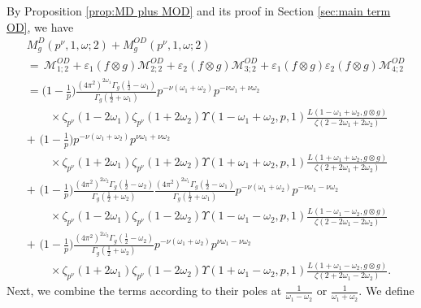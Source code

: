 \documentclass[12pt]{amsart}
\theoremstyle{plain}
\theoremstyle{definition}
\begin{document}
By Proposition \ref{prop:MD plus MOD} and its proof in Section \ref{sec:main term OD}, we have
    \begin{align*}
     &M_g^{D}(p^\nu, 1,\omega;2) +M_g^{OD}(p^\nu, 1, \omega;2)
     \\
    &=\, \mathscr{M}^{OD}_{1;2}
    +   \varepsilon_1(f\otimes g ) \mathscr{M}^{OD}_{2;2}
    +   \varepsilon_2(f\otimes g ) \mathscr{M}^{OD}_{3;2}
    +   \varepsilon_1(f\otimes g )   \varepsilon_2(f\otimes g ) 
    \mathscr{M}^{OD}_{4;2}
    \\
    &=  \Big(1-\frac{1}{p}\Big)
    \frac{(4\pi^2)^{2\omega_1}\Gamma_g(\frac12-\omega_1)}{\Gamma_g(\frac12+\omega_1) }
    p^{-\nu(\omega_1+\omega_2)}  p^{-\nu\omega_1+\nu\omega_2}  
    \\
    &\qquad \times 
    \zeta_{p^\nu}(1-2\omega_1)    
    \zeta_{p^\nu}(1+2\omega_2)
      \Upsilon(1-\omega_1+\omega_2, p, 1) \frac{L(1-\omega_1+\omega_2, g\otimes g)}{\zeta(2-2\omega_1+2\omega_2)}
    \\
    &+\,\,     \Big(1-\frac{1}{p}\Big)
    p^{-\nu(\omega_1+\omega_2)}  p^{\nu\omega_1+\nu\omega_2}  
    \\
    &\qquad \times 
    \zeta_{p^\nu}(1+2\omega_1)
    \zeta_{p^\nu}(1+2\omega_2)
            \Upsilon(1+\omega_1+\omega_2, p, 1) \frac{L(1+\omega_1+\omega_2, g\otimes g)}{\zeta(2+2\omega_1+2\omega_2)}
    \\   
    &+\,\,   \Big(1-\frac{1}{p}\Big)   \frac{(4\pi^2)^{2\omega_2}\Gamma_g(\frac12-\omega_2)}{\Gamma_g(\frac12+\omega_2) }    
    \frac{(4\pi^2)^{2\omega_1}\Gamma_g(\frac12-\omega_1)}{\Gamma_g(\frac12+\omega_1)}
    p^{-\nu(\omega_1+\omega_2)}  p^{-\nu\omega_1-\nu\omega_2} 
    \\ 
    &\qquad \times 
    \zeta_{p^\nu}(1-2\omega_1)
    \zeta_{p^\nu}(1-2\omega_2) 
            \Upsilon(1-\omega_1-\omega_2, p, 1) \frac{L(1-\omega_1-\omega_2, g\otimes g)}{\zeta(2-2\omega_1-2\omega_2)}
    \\
    &+\,\,  \Big(1-\frac{1}{p}\Big)  \frac{(4\pi^2)^{2\omega_2}\Gamma_g(\frac12-\omega_2)}{\Gamma_g(\frac12+\omega_2) }   
    p^{-\nu(\omega_1+\omega_2)}  p^{\nu\omega_1-\nu\omega_2} 
    \\ 
    &\qquad \times 
    \zeta_{p^\nu}(1+2\omega_1)
    \zeta_{p^\nu}(1-2\omega_2)
      \Upsilon(1+\omega_1-\omega_2, p, 1) \frac{L(1+\omega_1-\omega_2, g\otimes g)}{\zeta(2+2\omega_1-2\omega_2)} .
    \end{align*}
Next, we combine the terms according to their poles at $\frac{1}{\omega_1-\omega_2}$ or $\frac{1}{\omega_1+\omega_2}$. We define
\end{document}
